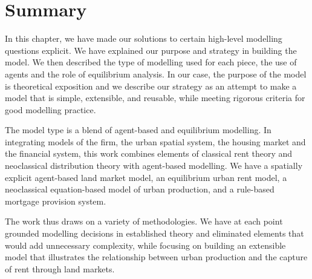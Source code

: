 \section{Summary}\label{sec-summary}
In this chapter, we have made our solutions to certain high-level modelling questions explicit. We have explained our purpose and strategy in building the model. We then described the type of modelling used for each piece, the use of agents and the role of equilibrium analysis. In our case, the purpose of the model is \gls{theoretical exposition} and we describe our strategy as an attempt to make a model that is simple, extensible, and reusable, while meeting rigorous criteria for good modelling practice. %

The model type is a blend of agent-based and equilibrium modelling.
In integrating models of the firm, the urban spatial system, the housing market and the financial system,  %
this work combines elements of classical rent theory and neoclassical distribution theory with agent-based modelling.  We have a spatially explicit agent-based land market model, an equilibrium urban rent model, a neoclassical equation-based model of urban production, and a rule-based mortgage provision system.

The work thus draws on a variety of methodologies. %
We have at each point grounded modelling decisions in established theory and eliminated elements that would add unnecessary complexity, while focusing on building an extensible model that illustrates the relationship between urban production and the capture of rent through land markets.








